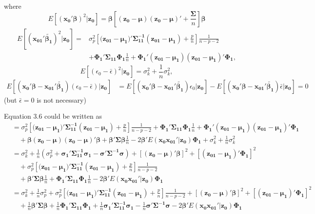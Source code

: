 \documentclass[11pt]{article}
\begin{document}
where 
$$E[(\boldsymbol{x_0'\beta})^2|\boldsymbol{z_0}]=\boldsymbol{\beta}\left[\boldsymbol{(z_0-\mu)(z_0-\mu)'}+\frac{\boldsymbol{\Sigma}}{n}\right]\boldsymbol{\beta}$$
$$\begin{aligned}E[(\boldsymbol{x_{01}'\tilde{\beta_1}})^2|\boldsymbol{z_0}]
=&\sigma_p^2 \left[(\boldsymbol{z_{01}-\mu_1)'\Sigma_{11}^{-1}(z_{01}-\mu_1)}+\frac{p}{n}\right]\frac{1}{n-p-2}\\
&+\boldsymbol{\Phi_1'\Sigma_{11}\Phi_1}\frac{1}{n}+\boldsymbol{\Phi_{1}'(z_{01}-\mu_{1})(z_{01}-\mu_1)'\Phi_1},\label{LemmaA7}
\end{aligned}
$$
$$E[(\epsilon_0-\bar{\epsilon})^2|\boldsymbol{z_0}]=\sigma_k^2+\frac{1}{n}\sigma_k^2,$$
$$\begin{aligned}
E[(\boldsymbol{x_0'\beta-x_{01}'\tilde{\beta_1}})(\epsilon_0-\bar{\epsilon})|\boldsymbol{z_0}]
&=E[(\boldsymbol{x_0'\beta-x_{01}'\tilde{\beta_1}})\epsilon_0|\boldsymbol{z_0}]-E[(\boldsymbol{x_0'\beta-x_{01}'\tilde{\beta_1}})\bar{\epsilon}|\boldsymbol{z_0}]=0
\end{aligned}$$
(but $\bar{\epsilon}=0$ is not necessary)

Equation 3.6 could be written as
$$\begin{aligned}
&=\sigma_p^2 \left[(\boldsymbol{z_{01}-\mu_1)'\Sigma_{11}^{-1}(z_{01}-\mu_1)}+\frac{p}{n}\right]\frac{1}{n-p-2}+\boldsymbol{\Phi_1'\Sigma_{11}\Phi_1}\frac{1}{n}+\boldsymbol{\Phi_{1}'(z_{01}-\mu_{1})(z_{01}-\mu_1)'\Phi_1}\\
&\quad+\boldsymbol{\beta}\boldsymbol{(z_0-\mu)(z_0-\mu)'\beta}+\boldsymbol{\beta'\Sigma}\boldsymbol{\beta}\frac{1}{n} -2\boldsymbol{\beta'}E(\boldsymbol{x_0x_{01}'}|\boldsymbol{z_0})\boldsymbol{\Phi_1}+\sigma_k^2+\frac{1}{n}\sigma_k^2\\
&=\sigma_k^2+\frac{1}{n}(\sigma_p^2+\boldsymbol{\sigma_1'\Sigma_{11}^{-1}\sigma_1-\sigma'\Sigma^{-1}\sigma})+[\boldsymbol{(z_{0}-\mu)'\beta}]^2+[\boldsymbol{(z_{01}-\mu_1)'\Phi_1}]^2\\
&\quad+\sigma_p^2 \left[(\boldsymbol{z_{01}-\mu_1)'\Sigma_{11}^{-1}(z_{01}-\mu_1)}+\frac{p}{n}\right]\frac{1}{n-p-2}\\
&\quad+\boldsymbol{\beta'\Sigma\beta}\frac{1}{n}+\boldsymbol{\Phi_1'\Sigma_{11}\Phi_1}\frac{1}{n}-2\boldsymbol{\beta'}E(\boldsymbol{x_0x_{01}'}|\boldsymbol{z_0})\boldsymbol{\Phi_1}\\
&=\sigma_k^2+\frac{1}{n}\sigma_p^2+\sigma_p^2 \left[(\boldsymbol{z_{01}-\mu_1)'\Sigma_{11}^{-1}(z_{01}-\mu_1)}+\frac{p}{n}\right]\frac{1}{n-p-2}
+[\boldsymbol{(z_{0}-\mu)'\beta}]^2+[\boldsymbol{(z_{01}-\mu_1)'\Phi_1}]^2\\
&\quad+\frac{1}{n}\boldsymbol{\beta'\Sigma\beta}+\frac{1}{n}\boldsymbol{\Phi_1'\Sigma_{11}\Phi_1}+\frac{1}{n}\boldsymbol{\sigma_1'\Sigma_{11}^{-1}\sigma_1}-\frac{1}{n}\boldsymbol{\sigma'\Sigma^{-1}\sigma}-2\boldsymbol{\beta'}E(\boldsymbol{x_0x_{01}'}|\boldsymbol{z_0})\boldsymbol{\Phi_1}
\end{aligned}$$
\end{document}
